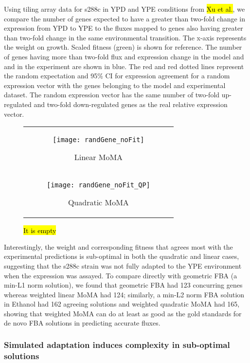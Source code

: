 Using tiling array data for s288c in YPD and YPE conditions from
\hl{Xu et al.}, we compare the number of genes expected to have a
greater than two-fold change in expression from YPD to YPE to the fluxes
mapped to genes also having greater than two-fold change in the same
environmental transition. The x-axis represents the weight on
growth. Scaled fitness (green) is shown for reference. The number of
genes having more than two-fold flux and expression change in the model and and
in the experiment are shown in blue. The red and red dotted lines
represent the random expectation and 95\% CI for expression agreement
for a random expression vector with the genes belonging to the model
and experimental dataset. The random expression vector has the same
number of two-fold up-regulated and two-fold down-regulated genes as the
real relative expression vector.

\begin{figure}
\centering
\begin{tabular}{c}
\begin{subfigure}[b]{\textwidth}
  \texttt{[image: randGene\_noFit]}
  \caption{Linear MoMA} 
  \label{fig:randGene_noFit}
\end{subfigure}
\\
\begin{subfigure}[b]{\textwidth}
  \texttt{[image: randGene\_noFit\_QP]}
  \caption{Quadratic MoMA} 
  \label{fig:randGene_noFit_QP}
\end{subfigure}
\\
\end{tabular}
\caption{\hl{It is empty}} 
\label{fig:wMoMA_expMatch}
\end{figure}


Interestingly, the weight and corresponding fitness that agrees most
with the experimental predictions is sub-optimal in both the quadratic
and linear cases, suggesting that the s288c strain was not fully
adapted to the YPE environment when the expression was assayed.  To
compare directly with geometric FBA (a min-L1 norm solution), we found
that geometric FBA had 123 concurring genes whereas weighted linear
MoMA had 124; similarly, a min-L2 norm FBA solution in Ethanol had 162
agreeing solutions and weighted quadratic MoMA had 165, showing that
weighted MoMA can do at least as good as the gold standards for de
novo FBA solutions in predicting accurate fluxes.


\subsubsection{Simulated adaptation induces complexity in sub-optimal solutions}

